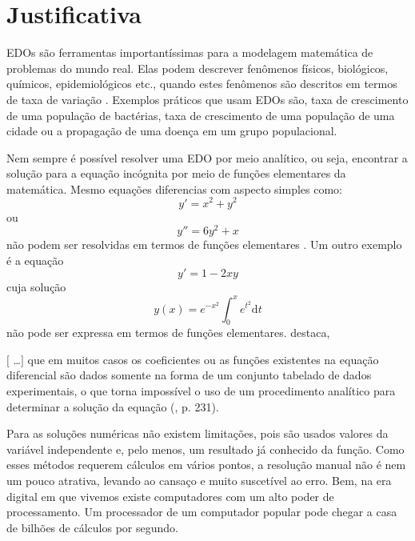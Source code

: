 \section{Justificativa}\label{ljustificativa}

EDOs são ferramentas importantíssimas 
para a modelagem matemática de problemas do mundo real. Elas podem
descrever fenômenos físicos, biológicos, químicos, epidemiológicos etc.,
quando estes fenômenos são descritos em termos de taxa de variação \cite[p.~293]{filho2007algoritmos}.
Exemplos práticos que usam EDOs são, taxa de crescimento de uma
população de bactérias, taxa de crescimento de uma população de uma
cidade ou a propagação de uma doença em um grupo populacional.

Nem sempre é possível resolver uma EDO por meio analítico, ou seja,
encontrar a solução para a equação incógnita por meio de funções
elementares da matemática. Mesmo equações diferencias com aspecto 
simples como:
\begin{equation*}
y' = x^2 + y^2
\end{equation*}
ou
\begin{equation*}
y'' = 6y^2 + x
\end{equation*} 
não podem ser resolvidas em termos de funções elementares \cite[p.~275]{calculo}.
Um outro exemplo é a equação
\begin{equation*}
y' = 1 - 2xy
\end{equation*}
cuja solução 
\begin{equation*}
y(x) = e^{-x^{2}} \int_0^x\! e^{t^{2}} \mathrm{d}t
\end{equation*}
não pode ser expressa em termos de funções elementares.
 destaca,
\begin{citacao}
$[$ \ldots $]$ que em muitos casos os coeficientes ou as funções existentes  na equação diferencial são
dados somente na forma de um conjunto tabelado de dados experimentais,
o que torna impossível o uso de um procedimento analítico para determinar
a solução da equação (\citeyear{sperandio2003calculo}, p. 231).
\end{citacao}

Para as soluções numéricas não existem limitações, pois são usados valores
da variável independente e, pelo  menos, um resultado já conhecido da função.
Como esses métodos requerem cálculos em vários pontos, a resolução
manual não é nem um pouco atrativa, levando ao cansaço e muito suscetível 
ao erro. Bem, na era digital em que vivemos existe computadores com um
alto poder de processamento. Um processador de um computador 
popular pode chegar a casa de bilhões de cálculos por segundo.

